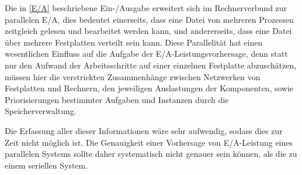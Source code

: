\documentclass[
	12pt,
	a4paper,
	BCOR10mm,
	DIV14,
	listof=totoc,
	bibliography=totoc,
	headsepline
]{scrreprt}
\begin{document}
Die in \ref{E/A} beschriebene Ein-/Ausgabe erweitert sich im Rechnerverbund zur parallelen E/A, dies bedeutet einerseits, dass eine Datei von mehreren Prozessen zeitgleich gelesen und bearbeitet werden kann, und andererseits, dass eine Datei über mehrere Festplatten verteilt sein kann. Diese Parallelität hat einen wesentlichen Einfluss auf die Aufgabe der E/A-Leistungsvorhersage, denn statt nur den Aufwand der Arbeitsschritte auf einer einzelnen Festplatte abzuschätzen, müssen hier die verstrickten Zusammenhänge zwischen Netzwerken von Festplatten und Rechnern, den jeweiligen Auslastungen der Komponenten, sowie Priorisierungen bestimmter Aufgaben und Instanzen durch die Speicherverwaltung.

Die Erfassung aller dieser Informationen wäre sehr aufwendig, sodass dies zur Zeit nicht möglich ist. Die Genauigkeit einer Vorhersage von E/A-Leistung eines parallelen Systems sollte daher systematisch nicht genauer sein können, als die zu einem seriellen System.



\end{document}
